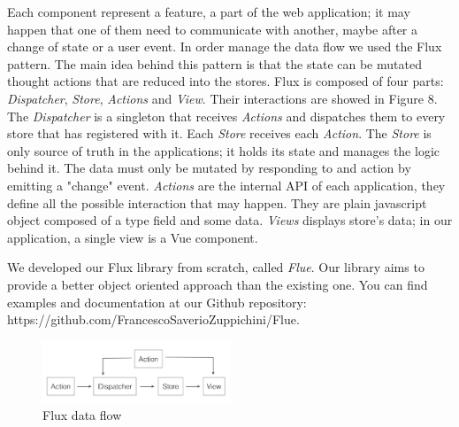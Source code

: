 \documentclass[]{usiinfbachelorproject}
\begin{document}
Each component represent a feature, a part of the web application; it may happen that one of them need to communicate with another, maybe after a change of state or a user event. In order manage the data flow we used the Flux pattern. The main idea behind this pattern is that the state can be mutated thought actions that are reduced into the stores. Flux is composed of four parts: \emph{Dispatcher}, \emph{Store}, \emph{Actions} and \emph{View}. Their interactions are showed in Figure 8.
The \emph{Dispatcher} is a singleton that receives \emph{Actions} and dispatches them to every store that has registered with it. Each \emph{Store} receives each \emph{Action}.
The \emph{Store} is only source of truth in the applications; it holds its state and manages the logic behind it. The data must only be mutated by responding to and action by emitting a "change" event.
\emph{Actions} are the internal API of each application, they define all the possible interaction that may happen. They are plain javascript object composed of a type field and some data.
\emph{Views} displays store's data; in our application, a single view is a Vue component.

We developed our Flux library from scratch, called \emph{Flue}. Our library aims to provide a better object oriented approach than the existing one. You can find examples and documentation at our Github repository: https://github.com/FrancescoSaverioZuppichini/Flue.

\begin{figure}[H]
  \centering
  \includegraphics[width=0.5\textwidth]{./images/flux_data_flow.png}
  \caption{Flux data flow}
\end{figure} 
\end{document}
